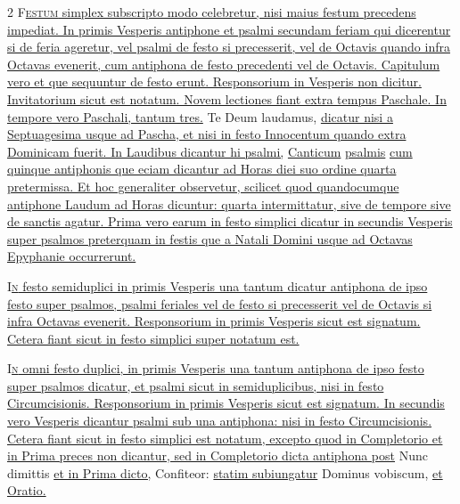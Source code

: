 \begin{multicols*}{2}
{\color{Red} }
\lettrine[lines=2]{\zallmancaps \color{Blue} F}{}\ul{\textsc{estum} simplex subscripto modo celebretur, nisi maius festum precedens impediat. In primis Vesperis antiphone et psalmi secundam feriam qui dicerentur si de feria ageretur, vel psalmi de festo si precesserit, vel de Octavis quando infra Octavas evenerit, cum antiphona de festo precedenti vel de Octavis. Capitulum vero et que sequuntur de festo erunt. Responsorium in Vesperis non dicitur. Invitatorium sicut est notatum. Novem lectiones fiant extra tempus Paschale. In tempore vero Paschali, tantum tres.} Te Deum laudamus, \ul{dicatur nisi a Septuagesima usque ad Pascha, et nisi in festo Innocentum quando extra Dominicam fuerit. In Laudibus dicantur hi psalmi,}     \ul{Canticum}  \ul{psalmis}  \ul{cum quinque antiphonis que eciam dicantur ad Horas diei suo ordine quarta pretermissa. Et hoc generaliter observetur, scilicet quod quandocumque antiphone Laudum ad Horas dicuntur: quarta intermittatur, sive de tempore sive de sanctis agatur.
Prima vero earum in festo simplici dicatur in secundis Vesperis super psalmos preterquam in festis que a Natali Domini usque ad Octavas Epyphanie occurrerunt.}

{\color{Red} }
\lettrine[lines=2]{\zallmancaps \color{Red} I}{}\ul{\textsc{n} festo semiduplici in primis Vesperis una tantum dicatur antiphona de ipso festo super psalmos, psalmi feriales vel de festo si precesserit vel de Octavis si infra Octavas evenerit. Responsorium in primis Vesperis sicut est signatum. Cetera fiant sicut in festo simplici super notatum est.}

{\color{Red} }
\lettrine[lines=2]{\zallmancaps \color{Blue} I}{}\ul{\textsc{n} omni festo duplici, in primis Vesperis una tantum antiphona de ipso festo super psalmos dicatur, et psalmi sicut in semiduplicibus, nisi in festo Circumcisionis. Responsorium in primis Vesperis sicut est signatum. In secundis vero Vesperis dicantur psalmi sub una antiphona: nisi in festo Circumcisionis.
Cetera fiant sicut in festo simplici est notatum, excepto quod in Completorio et in Prima preces non dicantur, sed in Completorio dicta antiphona post} Nunc dimittis \ul{et in Prima dicto,} Confiteor: \ul{statim subiungatur} Dominus vobiscum, \ul{et Oratio.}


\end{multicols*}

